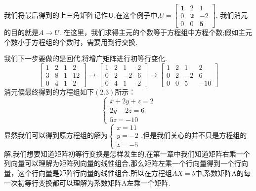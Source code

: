 \documentclass[oneside]{book}
\begin{document}
	 \qquad 我们将最后得到的上三角矩阵记作$ \textbf{U} $,在这个例子中,$ U=	\left[
	 \begin{array}{ccc}
	 	\textbf{1} & 2 & 1 \\
	 	0 & \textbf{2} & -2\\
	 	0 & 0 & \textbf{5}
	 \end{array}
	 \right] $.
	 我们消元的目的就是$ A\rightarrow U $.
	 在这里，我们求得主元的个数等于方程组中方程个数;假如主元个数小于方程组的个数时，需要用到行交换.
	 
	 我们下一步要做的是回代,将增广矩阵进行初等行变化.
	 $$
	 \left[
	 \begin{array}{cccc}
	 	1 & 2 & 1 & 2\\
	 	3 & 8 & 1 & 12\\
	 	0 & 4 & 1 & 2
	 \end{array}
	 \right]
	 \rightarrow
	 \left[
	 \begin{array}{cccc}
	 	1 & 2 & 1 & 2\\
	 	0 & 2 & -2 & 6\\
	 	0 & 4 & 1 & 2
	 \end{array}
	 \right]
	 \rightarrow
	 \left[
	 \begin{array}{cccc}
	 	1 & 2 & 1 & 2\\
	 	0 & 2 & -2 & 6\\
	 	0 & 0 & 5 & -10
	 \end{array}
	 \right]
	 $$
	 \qquad 消元侯最终得到的方程组如下$ (2.3) $所示：
	 \begin{equation}
	 	\left\{
	 		\begin{array}{c}
	 			x+2y+z=2\\
	 			2y-2z=6\\
	 			5z=-10
	 		\end{array}
	 	\right.
	 \end{equation}
    \qquad 显然我们可以得到原方程组的解为$ \left\{
    \begin{array}{c}
    	x=11\\
    	y=-2\\
    	z=-5
    \end{array}
    \right. $,但是我们关心的并不只是方程组的解,我们想要知道矩阵初等行变换是怎样发生的,在第一章中我们知道矩阵右乘一个列向量可以理解为矩阵列向量的线性组合,那么矩阵左乘一个行向量得到一个行向量，这个行向量是矩阵行向量的线性组合.所以在方程组$ AX=b $中,系数矩阵A的每一次初等行变换都可以理解为系数矩阵A左乘一个矩阵.
    
\end{document}
